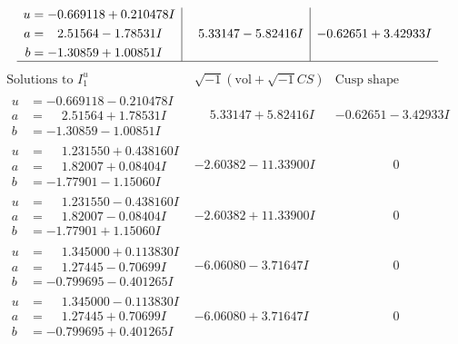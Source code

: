 \documentclass[1p]{elsarticle_modified}
\theoremstyle{definition}
\newcommand{\I}{\sqrt{-1}}
\begin{document}
$$\begin{array}{c|c|c}
\begin{aligned}
u &= -0.669118 + 0.210478 I \\
a &= \phantom{-}2.51564 - 1.78531 I \\
b &= -1.30859 + 1.00851 I\end{aligned}
 & \phantom{-}5.33147 - 5.82416 I & -0.62651 + 3.42933 I\\
 \hline 
 \end{array}$$\newpage$$\begin{array}{c|c|c}  
\text{Solutions to }I^u_{1}& \I (\text{vol} + \sqrt{-1}CS) & \text{Cusp shape}\\
 \hline 
\begin{aligned}
u &= -0.669118 - 0.210478 I \\
a &= \phantom{-}2.51564 + 1.78531 I \\
b &= -1.30859 - 1.00851 I\end{aligned}
 & \phantom{-}5.33147 + 5.82416 I & -0.62651 - 3.42933 I \\ \hline\begin{aligned}
u &= \phantom{-}1.231550 + 0.438160 I \\
a &= \phantom{-}1.82007 + 0.08404 I \\
b &= -1.77901 - 1.15060 I\end{aligned}
 & -2.60382 - 11.33900 I & \phantom{-0.000000 } 0 \\ \hline\begin{aligned}
u &= \phantom{-}1.231550 - 0.438160 I \\
a &= \phantom{-}1.82007 - 0.08404 I \\
b &= -1.77901 + 1.15060 I\end{aligned}
 & -2.60382 + 11.33900 I & \phantom{-0.000000 } 0 \\ \hline\begin{aligned}
u &= \phantom{-}1.345000 + 0.113830 I \\
a &= \phantom{-}1.27445 - 0.70699 I \\
b &= -0.799695 - 0.401265 I\end{aligned}
 & -6.06080 - 3.71647 I & \phantom{-0.000000 } 0 \\ \hline\begin{aligned}
u &= \phantom{-}1.345000 - 0.113830 I \\
a &= \phantom{-}1.27445 + 0.70699 I \\
b &= -0.799695 + 0.401265 I\end{aligned}
 & -6.06080 + 3.71647 I & \phantom{-0.000000 } 0 \\ \hline\begin{aligned}

\end{aligned}
\end{array}$$
\end{document}

